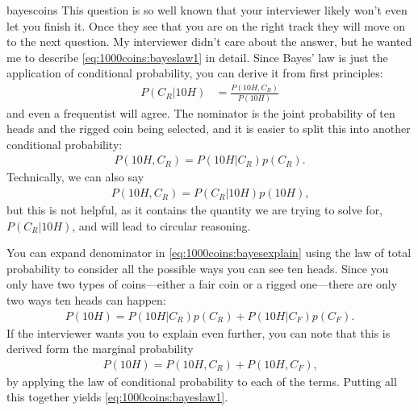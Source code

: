 \begin{answer}{bayescoins}
This question is so well known that your interviewer likely won't even let you finish it.
Once they see that you are on the right track they will move on to the next question.
My interviewer didn't care about the answer, but he wanted me to describe \eqref{eq:1000coins:bayeslaw1} in detail.
Since Bayes' law is just the application of conditional probability, you can derive it from first principles:
\begin{align}
\label{eq:1000coins:bayesexplain}
 P( C_{R} \vert 10H)
 &=
 \frac{
    P( 10H , C_{R} )
 }{
    P( 10H )
 }
\end{align}
and even a frequentist will agree.
The nominator is the joint probability of ten heads and the rigged coin being selected, and it is easier to split this into another conditional probability:
\begin{align*}
    P( 10H , C_{R} )
    =
    P( 10H \vert C_{R} ) p( C_{R} )
    \text{.}
\end{align*}
Technically, we can also say
\begin{align*}
    P( 10H , C_{R} )
    =
    P( C_{R} \vert 10H  ) p( 10H  )
    \text{,}
\end{align*}
but this is not helpful, as it contains the quantity we are trying to solve for, $P( C_{R} \vert 10H  )$, and will lead to circular reasoning.

You can expand denominator in
\eqref{eq:1000coins:bayesexplain}
using the law of total probability to consider all the possible ways you can see ten heads.
Since you only have two types of coins---either a fair coin or a rigged one---there are only two ways ten heads can happen:
\begin{align*}
    P( 10H ) =
    P( 10H \vert C_{R} )p(C_{R})
    +
    P( 10H \vert C_{F} )p(C_{F})
    \text{.}
\end{align*}
If the interviewer wants you to explain even further, you can note that this is derived form the marginal probability
\begin{align*}
    P( 10H ) =
    P( 10H , C_{R} )
    +
    P( 10H , C_{F} )
    \text{,}
\end{align*}
by applying the law of conditional probability to each of the terms.
Putting all this together yields \eqref{eq:1000coins:bayeslaw1}.


\end{answer}
